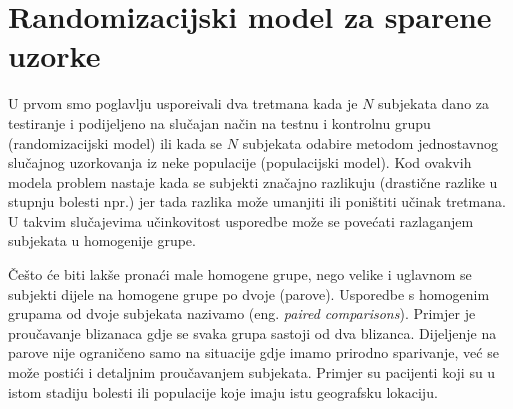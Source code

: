 %
\section{Randomizacijski model za sparene uzorke} \label{sec:2p1}
%
\setcounter{equation}{0}

U prvom smo poglavlju uspore\dj{}ivali dva tretmana kada je $N$ subjekata
dano za testiranje i podijeljeno na slu\v{c}ajan na\v{c}in na testnu i
kontrolnu grupu (randomizacijski model) ili kada se $N$ subjekata
odabire metodom jednostavnog slu\v{c}ajnog uzorkovanja iz neke
populacije (populacijski model). Kod ovakvih modela problem nastaje
kada se subjekti zna\v{c}ajno razlikuju (drasti\v{c}ne razlike
u stupnju bolesti npr.) jer tada razlika mo\v{z}e umanjiti ili
poni\v{s}titi u\v{c}inak tretmana. U takvim slu\v{c}ajevima
u\v{c}inkovitost usporedbe mo\v{z}e se pove\'{c}ati razlaganjem
subjekata u homogenije grupe.

\v{C}e\v{s}to \'{c}e biti lak\v{s}e prona\'{c}i male homogene
grupe, nego velike i uglavnom se subjekti dijele na homogene grupe
po dvoje (parove). Usporedbe s homogenim grupama od dvoje subjekata
nazivamo  (eng. \textit{paired comparisons}).
Primjer je prou\v{c}avanje blizanaca
gdje se svaka grupa sastoji od dva blizanca. Dijeljenje na
parove nije ograni\v{c}eno samo na situacije gdje imamo
prirodno sparivanje, ve\'{c} se mo\v{z}e posti\'{c}i i 
detaljnim prou\v{c}avanjem subjekata. Primjer su pacijenti
koji su u istom stadiju bolesti ili populacije koje imaju
istu geografsku lokaciju.

